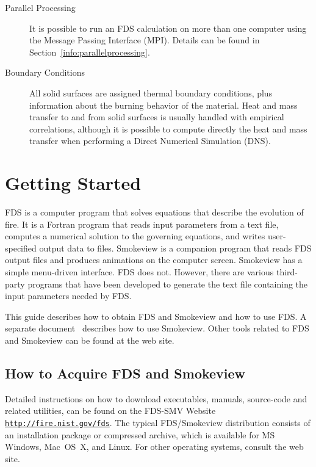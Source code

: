 \documentclass[11pt]{book}
\newcommand{\ct}{\tt\small}
\begin{document}
\begin{description}
\item[Parallel Processing] It is possible to run an FDS calculation on
more than one computer using the Message Passing Interface (MPI). Details
can be found in Section~\ref{info:parallelprocessing}.

\item[Boundary Conditions]
All solid surfaces are assigned thermal boundary conditions, plus
information about the burning behavior of the material.
Heat and mass transfer to and from solid surfaces is
usually handled with empirical correlations, although it is possible
to compute directly the heat and mass transfer when performing a
Direct Numerical Simulation (DNS).

\end{description}





\chapter{Getting Started}
\label{info:gettingstarted}

FDS is a computer program that solves equations that describe the evolution of fire.
It is a Fortran program that reads input parameters from a text file, computes
a numerical solution to the governing equations, and writes user-specified output data to files.
Smokeview is a companion program that reads FDS output files and produces animations on the computer screen.
Smokeview has a simple menu-driven interface. FDS does not. However, there are various third-party programs
that have been developed to generate the text file containing the input parameters needed by FDS.

This guide describes how to obtain FDS and Smokeview and how to use FDS.
A separate document~\cite{Smokeview_Users_Guide} describes how to use Smokeview. Other tools related to
FDS and Smokeview can be found at the web site.

\section{How to Acquire FDS and Smokeview}
\label{info:acquire}
Detailed instructions on how to download executables, manuals, source-code and related utilities,
can be found on the FDS-SMV Website
\href{http://fire.nist.gov/fds}{{\ct http://fire.nist.gov/fds}}.
The typical FDS/Smokeview distribution consists of an installation package or compressed archive,
which is available for MS Windows, Mac~OS~X, and Linux.
For other operating systems, consult the web site.
\end{document}
